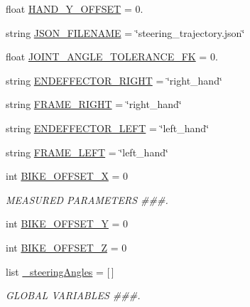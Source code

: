 \begin{DoxyCompactItemize}
\item 
float \mbox{\hyperlink{namespacecapture__steering__trajectory_afedc720ec2f1ae008c7e2a15d5eba30f}{H\+A\+N\+D\+\_\+\+Y\+\_\+\+O\+F\+F\+S\+ET}} = 0.
\item 
string \mbox{\hyperlink{namespacecapture__steering__trajectory_a6ed59699d39b32779709000cdcdd9e9d}{J\+S\+O\+N\+\_\+\+F\+I\+L\+E\+N\+A\+ME}} = \char`\"{}steering\+\_\+trajectory.\+json\char`\"{}
\item 
float \mbox{\hyperlink{namespacecapture__steering__trajectory_a01d475f5808ae6bfe167ad850c0e7ded}{J\+O\+I\+N\+T\+\_\+\+A\+N\+G\+L\+E\+\_\+\+T\+O\+L\+E\+R\+A\+N\+C\+E\+\_\+\+FK}} = 0.
\item 
string \mbox{\hyperlink{namespacecapture__steering__trajectory_ac33282d2fd49b9d5835e70d55a55d7b4}{E\+N\+D\+E\+F\+F\+E\+C\+T\+O\+R\+\_\+\+R\+I\+G\+HT}} = \char`\"{}right\+\_\+hand\char`\"{}
\item 
string \mbox{\hyperlink{namespacecapture__steering__trajectory_ab8e2736c081bd5f131c64c5b11d8c097}{F\+R\+A\+M\+E\+\_\+\+R\+I\+G\+HT}} = \char`\"{}right\+\_\+hand\char`\"{}
\item 
string \mbox{\hyperlink{namespacecapture__steering__trajectory_a491a2bb283877ea14d109687ed211295}{E\+N\+D\+E\+F\+F\+E\+C\+T\+O\+R\+\_\+\+L\+E\+FT}} = \char`\"{}left\+\_\+hand\char`\"{}
\item 
string \mbox{\hyperlink{namespacecapture__steering__trajectory_ab5891b2e100fdd4f2ff71d71963e8875}{F\+R\+A\+M\+E\+\_\+\+L\+E\+FT}} = \char`\"{}left\+\_\+hand\char`\"{}
\item 
int \mbox{\hyperlink{namespacecapture__steering__trajectory_a78c1a051c5eb8cc721a34f9752872273}{B\+I\+K\+E\+\_\+\+O\+F\+F\+S\+E\+T\+\_\+X}} = 0
\begin{DoxyCompactList}\small\item\em M\+E\+A\+S\+U\+R\+ED P\+A\+R\+A\+M\+E\+T\+E\+RS \#\#\#. \end{DoxyCompactList}\item 
int \mbox{\hyperlink{namespacecapture__steering__trajectory_a0964d879706b482c1e72d4c7a003c088}{B\+I\+K\+E\+\_\+\+O\+F\+F\+S\+E\+T\+\_\+Y}} = 0
\item 
int \mbox{\hyperlink{namespacecapture__steering__trajectory_a3632a279857737351d0c0a1412e0bb0b}{B\+I\+K\+E\+\_\+\+O\+F\+F\+S\+E\+T\+\_\+Z}} = 0
\item 
list \mbox{\hyperlink{namespacecapture__steering__trajectory_af34c5ae3eda4c114f385f276471eba61}{\+\_\+steering\+Angles}} = \mbox{[}$\,$\mbox{]}
\begin{DoxyCompactList}\small\item\em G\+L\+O\+B\+AL V\+A\+R\+I\+A\+B\+L\+ES \#\#\#. \end{DoxyCompactList}\item 

\end{DoxyCompactItemize}
